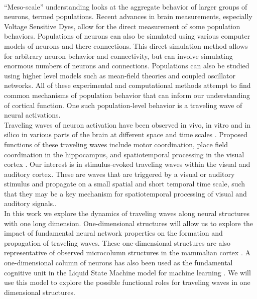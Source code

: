 \documentclass[a4paper,11pt]{article}
\begin{document}
\\
``Meso-scale'' understanding looks at the aggregate behavior of larger groups of neurons, termed populations.
Recent advances in brain measurements, especially Voltage Sensitive Dyes, allow for the direct measurement of some population behaviors.
Populations of neurons can also be simulated using various computer models of neurons and there connections.
This direct simulation method allows for arbitrary neuron behavior and connectivity, but can involve simulating enormous numbers of neurons and connections.
Populations can also be studied using higher level models such as mean-field theories and coupled oscillator networks.
All of these experimental and computational methods attempt to find common mechanisms of population behavior that can inform our understanding of cortical function.
One such population-level behavior is a traveling wave of neural activations.
\\
Traveling waves of neuron activation have been observed in vivo, in vitro and in silico in various parts of the brain at different space and time scales \cite{keane2015}\cite{wu2008}.
Proposed functions of these traveling waves include motor coordination, place field coordination in the hippocampus, and spatiotemporal processing in the visual cortex \cite{muller2018}. 
Our interest is in stimulus-evoked traveling waves within the visual and auditory cortex.
These are waves that are triggered by a visual or auditory stimulus and propagate on a small spatial and short temporal time scale, such that they may be a key mechanism for spatiotemporal processing of visual and auditory signals..
\\
In this work we explore the dynamics of traveling waves along neural structures with one long dimension.
One-dimensional structures will allow us to explore the impact of fundamental neural network properties on the formation and propagation of traveling waves.
These one-dimensional structures are also representative of observed microcolumn structures in the mammalian cortex \cite{cruz2000}\cite{cruz2005}.
A one-dimensional column of neurons has also been used as the fundamental cognitive unit in the Liquid State Machine model for machine learning \cite{maas2002}.
We will use this model to explore the possible functional roles for traveling waves in one dimensional structures.
\end{document}
